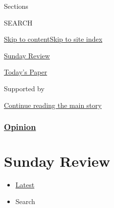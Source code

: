 Sections

SEARCH

\protect\hyperlink{site-content}{Skip to
content}\protect\hyperlink{site-index}{Skip to site index}

\href{https://www.nytimes3xbfgragh.onion/section/opinion/sunday}{Sunday
Review}

\href{https://myaccount.nytimes3xbfgragh.onion/auth/login?response_type=cookie\&client_id=vi}{}

\href{https://www.nytimes3xbfgragh.onion/section/todayspaper}{Today's
Paper}

Supported by

\protect\hyperlink{after-sponsor}{Continue reading the main story}

\hypertarget{opinion}{%
\subsubsection{\texorpdfstring{\href{/section/opinion}{Opinion}}{Opinion}}\label{opinion}}

\hypertarget{sunday-review}{%
\section{Sunday Review}\label{sunday-review}}

\begin{itemize}
\tightlist
\item
  \protect\hyperlink{stream-panel}{Latest}
\item
  Search
\end{itemize}

